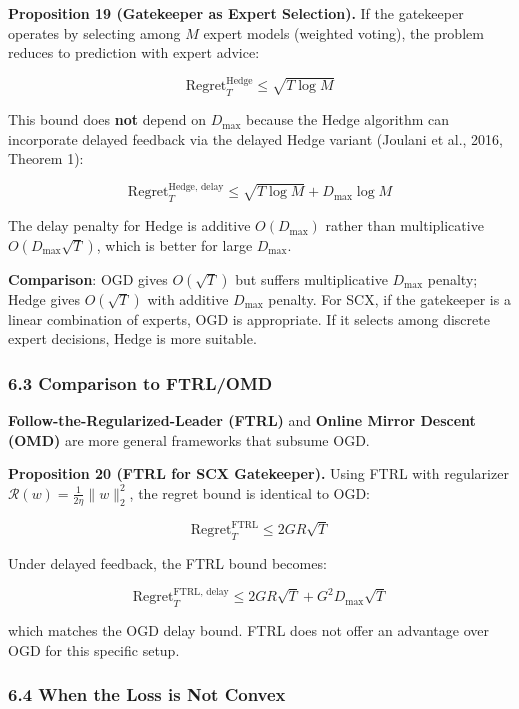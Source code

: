 \documentclass[
  12pt,
]{ctexart}
\begin{document}
\textbf{Proposition 19 (Gatekeeper as Expert Selection).} If the
gatekeeper operates by selecting among \(M\) expert models (weighted
voting), the problem reduces to prediction with expert advice:

\[\text{Regret}_T^{\text{Hedge}} \leq \sqrt{T \log M}\]

This bound does \textbf{not} depend on \(D_{\max}\) because the Hedge
algorithm can incorporate delayed feedback via the delayed Hedge variant
(Joulani et al., 2016, Theorem 1):

\[\text{Regret}_T^{\text{Hedge, delay}} \leq \sqrt{T \log M} + D_{\max} \log M\]

The delay penalty for Hedge is additive \(O(D_{\max})\) rather than
multiplicative \(O(D_{\max}\sqrt{T})\), which is better for large
\(D_{\max}\).

\textbf{Comparison}: OGD gives \(O(\sqrt{T})\) but suffers
multiplicative \(D_{\max}\) penalty; Hedge gives \(O(\sqrt{T})\) with
additive \(D_{\max}\) penalty. For SCX, if the gatekeeper is a linear
combination of experts, OGD is appropriate. If it selects among discrete
expert decisions, Hedge is more suitable.

\subsubsection{6.3 Comparison to FTRL/OMD}\label{comparison-to-ftrlomd}

\textbf{Follow-the-Regularized-Leader (FTRL)} and \textbf{Online Mirror
Descent (OMD)} are more general frameworks that subsume OGD.

\textbf{Proposition 20 (FTRL for SCX Gatekeeper).} Using FTRL with
regularizer \(\mathcal{R}(w) = \frac{1}{2\eta}\|w\|_2^2\), the regret
bound is identical to OGD:

\[\text{Regret}_T^{\text{FTRL}} \leq 2GR\sqrt{T}\]

Under delayed feedback, the FTRL bound becomes:

\[\text{Regret}_T^{\text{FTRL, delay}} \leq 2GR\sqrt{T} + G^2 D_{\max} \sqrt{T}\]

which matches the OGD delay bound. FTRL does not offer an advantage over
OGD for this specific setup.

\subsubsection{6.4 When the Loss is Not
Convex}\label{when-the-loss-is-not-convex}
\end{document}
